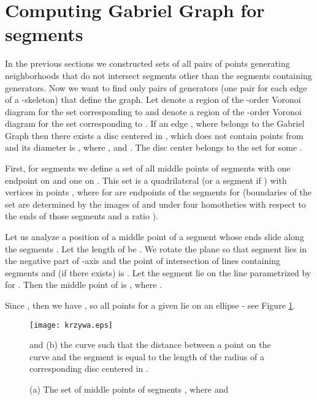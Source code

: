 \documentclass[11pt]{llncs}
\begin{document}
\section{Computing Gabriel Graph for segments}



 In the previous sections we constructed sets of all pairs of points generating 
neighborhoods that do not intersect segments other than the segments containing generators. 
Now we want to find only  pairs of generators (one pair for each edge 
of a -skeleton) that define the graph.   
Let  denote a region of the -order Voronoi diagram for the set 
corresponding to  and  denote a region of the -order Voronoi 
diagram for the set  corresponding to .
If an edge , where  belongs to the Gabriel Graph then there 
exists a disc  centered in , which does not contain points from 
 and its diameter is , where , 
 and . 
The disc center  belongs to the set  
for some .

 First, for segments  we define a set of all middle points 
of segments with one endpoint on  and one on .
This set is a quadrilateral  (or a segment if ) with vertices 
in points , where  
for  are endpoints of the segments  for  (boundaries of the set 
 are determined by the images of  and  under four homotheties with respect to the ends of those segments 
and a ratio ).






 




 Let us analyze a position of a middle point of a segment  whose ends slide 
along the segments . Let the length of  be .  
We rotate the plane so that segment  lies in the negative part of -axis 
and the point of intersection of lines containing segments  and  
(if there exists) is .
 Let the segment  lie on the line parametrized by
 for . Then the middle point of  
is , where . 

Since , 
then we have , so all points 
 for a given  lie on an ellipse - see Figure \ref{fig:krzywa}.



\begin{figure}[htbp]
\centering
\texttt{[image: krzywa.eps]}
\caption{(a) The set of middle points of segments , 
where  and } and (b) the curve  such that the distance between a point on the curve  and the segment  is equal to the length of the radius of a corresponding disc centered in .
\label{fig:krzywa}
\end{figure}   
\end{document}
